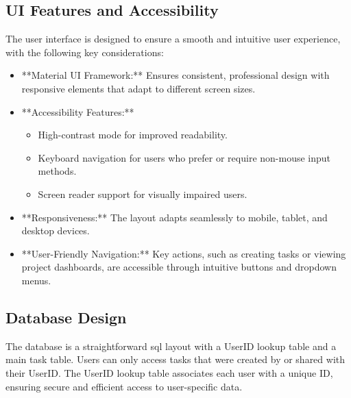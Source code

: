\documentclass{article}
\begin{document}
\subsection{UI Features and Accessibility}
The user interface is designed to ensure a smooth and intuitive user experience, with the following key considerations:
\begin{itemize}
    \item **Material UI Framework:** Ensures consistent, professional design with responsive elements that adapt to different screen sizes.
    \item **Accessibility Features:**
    \begin{itemize}
        \item High-contrast mode for improved readability.
        \item Keyboard navigation for users who prefer or require non-mouse input methods.
        \item Screen reader support for visually impaired users.
    \end{itemize}
    \item **Responsiveness:** The layout adapts seamlessly to mobile, tablet, and desktop devices.
    \item **User-Friendly Navigation:** Key actions, such as creating tasks or viewing project dashboards, are accessible through intuitive buttons and dropdown menus.
\end{itemize}

\subsection{Database Design}
The database is a straightforward \Gls{sql} layout with a UserID lookup table and a main task table. Users can only access tasks that were created by or shared with their UserID. The UserID lookup table associates each user with a unique ID, ensuring secure and efficient access to user-specific data.
\end{document}
